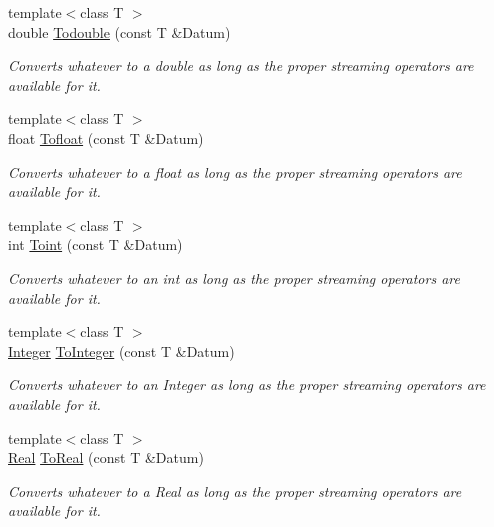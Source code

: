 \begin{DoxyCompactItemize}
{\footnotesize template$<$class T $>$ }\\double \hyperlink{namespaceMezzanine_a2d68761c8584c5b332d5163d268dad5f}{Todouble} (const T \&Datum)
\begin{DoxyCompactList}\small\item\em Converts whatever to a double as long as the proper streaming operators are available for it. \item\end{DoxyCompactList}\item 
{\footnotesize template$<$class T $>$ }\\float \hyperlink{namespaceMezzanine_a033b1e899e15516a76027b1090942d69}{Tofloat} (const T \&Datum)
\begin{DoxyCompactList}\small\item\em Converts whatever to a float as long as the proper streaming operators are available for it. \item\end{DoxyCompactList}\item 
{\footnotesize template$<$class T $>$ }\\int \hyperlink{namespaceMezzanine_aadc9a78cb1529bed06ae6645aa64e26b}{Toint} (const T \&Datum)
\begin{DoxyCompactList}\small\item\em Converts whatever to an int as long as the proper streaming operators are available for it. \item\end{DoxyCompactList}\item 
{\footnotesize template$<$class T $>$ }\\\hyperlink{namespaceMezzanine_ac3576e52af3c62d13dde94829e0c5465}{Integer} \hyperlink{namespaceMezzanine_a7105ab0353c89b20aff864c637b905d2}{ToInteger} (const T \&Datum)
\begin{DoxyCompactList}\small\item\em Converts whatever to an Integer as long as the proper streaming operators are available for it. \item\end{DoxyCompactList}\item 
{\footnotesize template$<$class T $>$ }\\\hyperlink{namespaceMezzanine_a726731b1a7df72bf3583e4a97282c6f6}{Real} \hyperlink{namespaceMezzanine_af7cf17f4a378b989eacb874a6a879f41}{ToReal} (const T \&Datum)
\begin{DoxyCompactList}\small\item\em Converts whatever to a Real as long as the proper streaming operators are available for it. \item\end{DoxyCompactList}\item 

\end{DoxyCompactItemize}
